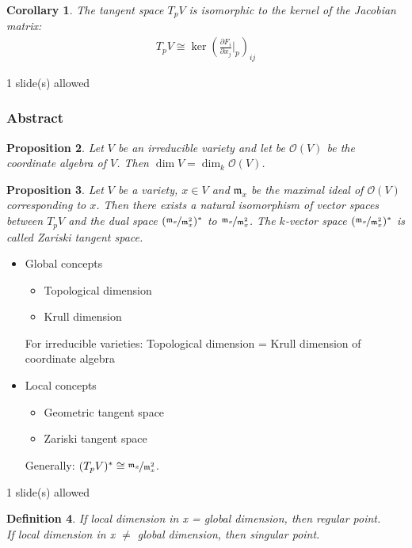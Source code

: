 \documentclass[11pt,a4paper,english]{scrartcl}
\newtheorem{defn}{Definition}
\newtheorem{prop}[defn]{Proposition}
\newtheorem{cor}[defn]{Corollary}
\newcommand{\needSlides}[1]{\newpage \begin{needSl}#1 slide(s) allowed\end{needSl}}
\begin{document}
\begin{cor}
\label{cortspaceJac}
The tangent space $T_p V$ is isomorphic to the kernel of the Jacobian matrix:
\begin{align*}
T_p V \cong \ker \left( \frac{\partial F_i}{\partial x_j}\bigg|_p  \right)_{ij}
\end{align*}
\end{cor}

\needSlides{1}
\subsubsection{Abstract}
\begin{prop}
Let $V$ be an irreducible variety and let be $\mathcal{O} (V)$ be the coordinate algebra of $V$. Then $\dim V = \dim_k \mathcal{O} (V)$.
\end{prop}

\begin{prop}
\label{propZarTSpace}
Let $V$ be a variety, $x\in V$ and $\mathfrak{m}_x$ be the maximal ideal of $\mathcal{O} (V)$ corresponding to $x$. Then there exists a natural isomorphism of vector spaces between $T_p V$ and the dual space $(\nicefrac{\mathfrak{m}_x}{\mathfrak{m}_x^2})^*$ to $\nicefrac{\mathfrak{m}_x}{\mathfrak{m}_x^2}$. The $k$-vector space $(\nicefrac{\mathfrak{m}_x}{\mathfrak{m}_x^2})^*$ is called \emph{Zariski tangent space}.
\end{prop}

\begin{itemize}
\item Global concepts
	\begin{itemize}
	\item Topological dimension
	\item Krull dimension
	\end{itemize}
	For irreducible varieties: Topological dimension = Krull dimension of coordinate algebra 
\item Local concepts
	\begin{itemize}
	\item Geometric tangent space
	\item Zariski tangent space
	\end{itemize}
	Generally: $(T_p V)^* \cong \nicefrac{\mathfrak{m}_x}{\mathfrak{m}_x^2}$.
\end{itemize}

\needSlides{1}
\begin{defn}
If local dimension in x = global dimension, then regular point.\\
If local dimension in x $\neq$ global dimension, then singular point.
\end{defn}
\end{document}
